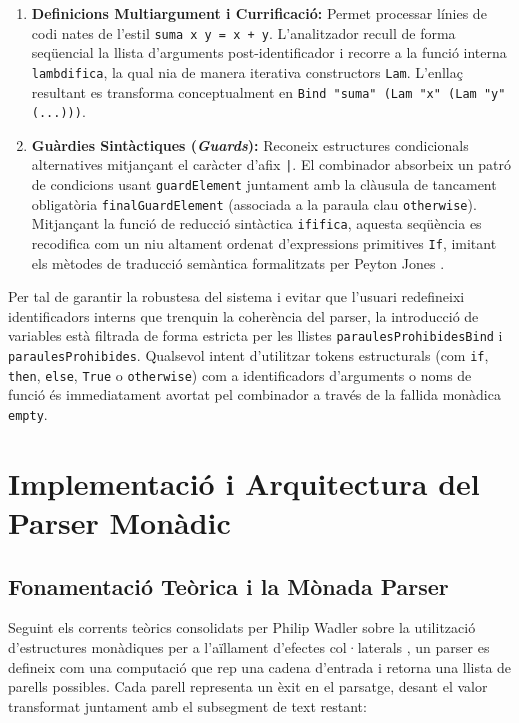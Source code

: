 \begin{enumerate}
    \item \textbf{Definicions Multiargument i Currificació:} Permet processar línies de codi nates de l'estil \texttt{suma x y = x + y}. L'analitzador recull de forma seqüencial la llista d'arguments post-identificador i recorre a la funció interna \texttt{lambdifica}, la qual nia de manera iterativa constructors \texttt{Lam}. L'enllaç resultant es transforma conceptualment en \texttt{Bind "suma" (Lam "x" (Lam "y" (...)))}.
    \item \textbf{Guàrdies Sintàctiques (\textit{Guards}):} Reconeix estructures condicionals alternatives mitjançant el caràcter d'afix \texttt{|}. El combinador absorbeix un patró de condicions usant \texttt{guardElement} juntament amb la clàusula de tancament obligatòria \texttt{finalGuardElement} (associada a la paraula clau \texttt{otherwise}). Mitjançant la funció de reducció sintàctica \texttt{ififica}, aquesta seqüència es recodifica com un niu altament ordenat d'expressions primitives \texttt{If}, imitant els mètodes de traducció semàntica formalitzats per Peyton Jones \cite{peyton1987implementation}.
\end{enumerate}

Per tal de garantir la robustesa del sistema i evitar que l'usuari redefineixi identificadors interns que trenquin la coherència del parser, la introducció de variables està filtrada de forma estricta per les llistes \texttt{paraulesProhibidesBind} i \texttt{paraulesProhibides}. Qualsevol intent d'utilitzar tokens estructurals (com \texttt{if}, \texttt{then}, \texttt{else}, \texttt{True} o \texttt{otherwise}) com a identificadors d'arguments o noms de funció és immediatament avortat pel combinador a través de la fallida monàdica \texttt{empty}.

\section{Implementació i Arquitectura del Parser Monàdic}

\subsection{Fonamentació Teòrica i la Mònada Parser}
Seguint els corrents teòrics consolidats per Philip Wadler sobre la utilització d'estructures monàdiques per a l'aïllament d'efectes col·laterals \cite{wadler1992essence}, un parser es defineix com una computació que rep una cadena d'entrada i retorna una llista de parells possibles. Cada parell representa un èxit en el parsatge, desant el valor transformat juntament amb el subsegment de text restant:

